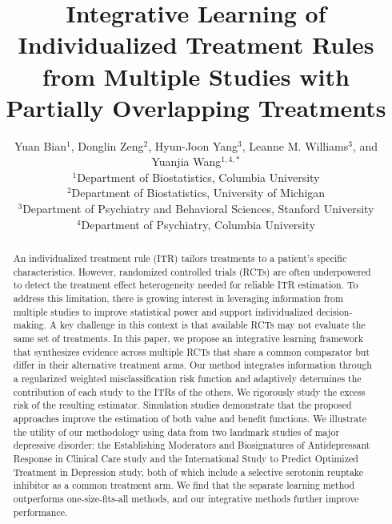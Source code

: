 \documentclass[12pt]{article}
\begin{document}
\def\spacingset#1{\renewcommand{\baselinestretch}%
{#1}\small\normalsize} \spacingset{1}

\title{Integrative Learning of Individualized Treatment Rules from Multiple Studies with Partially Overlapping Treatments}

\author{Yuan Bian$^{1}$, Donglin Zeng$^{2}$, Hyun-Joon Yang$^{3}$, Leanne M. Williams$^{3}$, and Yuanjia Wang$^{1,4,*}$\\
$^{1}$Department of Biostatistics, Columbia University\\
$^{2}$Department of Biostatistics, University of Michigan\\
$^{3}$Department of Psychiatry and Behavioral Sciences, Stanford University\\
$^{4}$Department of Psychiatry, Columbia University\\
}
\date{}

\maketitle

\begin{abstract}
An individualized treatment rule (ITR) tailors treatments to a patient’s specific characteristics. However, randomized controlled trials (RCTs) are often underpowered to detect the treatment effect heterogeneity needed for reliable ITR estimation. To address this limitation, there is growing interest in leveraging information from multiple studies to improve statistical power and support individualized decision-making. A key challenge in this context is that available RCTs may not evaluate the same set of treatments. In this paper, we propose an integrative learning framework that synthesizes evidence across multiple RCTs that share a common comparator but differ in their alternative treatment arms. Our method integrates information through a regularized weighted misclassification risk function and adaptively determines the contribution of each study to the ITRs of the others. We rigorously study the excess risk of the resulting estimator. Simulation studies demonstrate that the proposed approaches improve the estimation of both value and benefit functions. We illustrate the utility of our methodology using data from two landmark studies of major depressive disorder: the Establishing Moderators and Biosignatures of Antidepressant Response in Clinical Care study and the International Study to Predict Optimized Treatment in Depression study, both of which include a selective serotonin reuptake inhibitor as a common treatment arm. We find that the separate learning method outperforms one-size-fits-all methods, and our integrative methods further improve performance.\\
\end{abstract}
\end{document}
